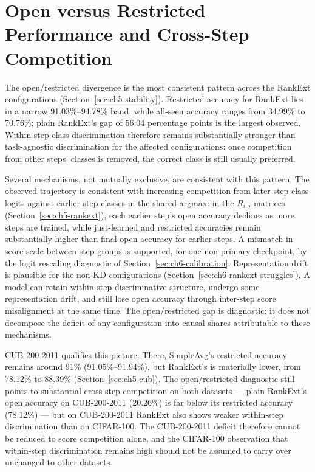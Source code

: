 \section{Open versus Restricted Performance and Cross-Step Competition}
\label{sec:ch6-open-restricted}

The open/restricted divergence is the most consistent pattern across the
RankExt configurations (Section~\ref{sec:ch5-stability}). Restricted
accuracy for RankExt lies in a narrow 91.03\%--94.78\% band, while all-seen
accuracy ranges from 34.99\% to 70.76\%; plain RankExt's gap of 56.04
percentage points is the largest observed. Within-step class discrimination
therefore remains substantially stronger than task-agnostic discrimination
for the affected configurations: once competition from other steps' classes
is removed, the correct class is still usually preferred.

Several mechanisms, not mutually exclusive, are consistent with this
pattern. The observed trajectory is consistent with increasing competition
from later-step class logits against earlier-step classes in the shared
argmax: in the $R_{i,j}$ matrices (Section~\ref{sec:ch5-rankext}), each
earlier step's open accuracy declines as more steps are trained, while
just-learned and restricted accuracies remain substantially higher than
final open accuracy for earlier steps. A mismatch in score scale between
step groups is supported, for one non-primary checkpoint, by the logit
rescaling diagnostic of Section~\ref{sec:ch6-calibration}. Representation
drift is plausible for the non-KD configurations
(Section~\ref{sec:ch6-rankext-struggles}). A model can retain within-step
discriminative structure, undergo some representation drift, and still
lose open accuracy through inter-step score misalignment at the same time.
The open/restricted gap is diagnostic: it does not decompose the deficit of
any configuration into causal shares attributable to these mechanisms.

CUB-200-2011 qualifies this picture. There, SimpleAvg's restricted accuracy
remains around 91\% (91.05\%--91.94\%), but RankExt's is materially lower,
from 78.12\% to 88.39\% (Section~\ref{sec:ch5-cub}). The open/restricted
diagnostic still points to substantial cross-step competition on both
datasets --- plain RankExt's open accuracy on CUB-200-2011 (20.26\%) is far
below its restricted accuracy (78.12\%) --- but on CUB-200-2011 RankExt also
shows weaker within-step discrimination than on CIFAR-100. The CUB-200-2011
deficit therefore cannot be reduced to score competition alone, and the
CIFAR-100 observation that within-step discrimination remains high should
not be assumed to carry over unchanged to other datasets.

